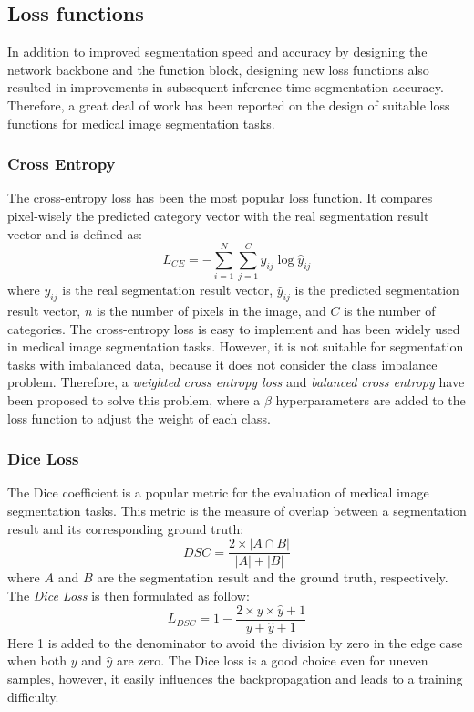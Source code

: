\subsection{Loss functions}
In addition to improved segmentation speed and accuracy
by designing the network backbone and the function block, designing new loss functions also resulted in improvements in subsequent inference-time segmentation accuracy. Therefore,
a great deal of work has been reported on the design of
suitable loss functions for medical image segmentation tasks.

\subsubsection{Cross Entropy}
The cross-entropy loss has been the most popular loss function. It compares pixel-wisely the predicted category vector with the real segmentation result vector and is defined as:
$$
L_{CE} = -\sum_{i=1}^{N} \sum_{j=1}^{C} y_{ij} \log \hat{y}_{ij}
$$
where $y_{ij}$ is the real segmentation result vector, $\hat{y}_{ij}$ is the
predicted segmentation result vector, $n$ is the number of pixels in the image,
and $C$ is the number of categories. The cross-entropy loss is easy to
implement and has been widely used in medical image segmentation tasks. However,
it is not suitable for segmentation tasks with imbalanced data, because it does
not consider the class imbalance problem. Therefore, a \emph{weighted cross
entropy loss} and \emph{balanced cross entropy} have been proposed to solve this
problem, where a $\beta$ hyperparameters are added to the loss function to adjust
the weight of each class.

\subsubsection{Dice Loss}
The Dice coefficient is a popular metric for the evaluation of medical image segmentation tasks. This metric is the measure of overlap between a segmentation result and its corresponding ground truth:
$$
DSC = \frac{2 \times |A \cap B|}{|A| + |B|}
$$
where $A$ and $B$ are the segmentation result and the ground truth, respectively. The \emph{Dice Loss} is then formulated as follow:
$$
L_{DSC} = 1 - \frac{2 \times y \times \hat{y} + 1}{y + \hat{y} + 1}
$$
Here 1 is added to the denominator to avoid the division by zero in the edge case when both $y$ and $\hat{y}$ are zero. The Dice loss is a good choice even for uneven samples, however, it easily influences the backpropagation and leads to a training difficulty.

